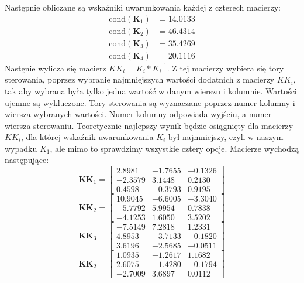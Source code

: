 Następnie obliczane są wskaźniki uwarunkowania każdej z czterech macierzy:
\begin{align}
  \text{cond}(\bm{K}_1) &= \num{14,0133} \\
  \text{cond}(\bm{K}_2) &= \num{46,4314} \\
  \text{cond}(\bm{K}_3) &= \num{35,4269} \\
  \text{cond}(\bm{K}_4) &= \num{20,1116}
\end{align}
Nastęnie wylicza się macierz $KK_i = K_i * K_i^{-1}$. Z tej macierzy
wybiera się tory sterowania, poprzez wybranie najmniejszych wartości dodatnich
z macierzy $KK_i$, tak aby wybrana była tylko jedna wartość w danym wierszu i kolumnie.
Wartości ujemne są wykluczone. Tory sterowania są wyznaczane poprzez numer kolumny
i wiersza wybranych wartości. Numer kolumny odpowiada wyjściu, a numer wiersza sterowaniu.
Teoretycznie najlepszy wynik będzie osiągnięty dla
macierzy $KK_i$, dla której wskaźnik uwarunkowania $K_i$ był najmniejszy, czyli
w naszym wypadku $K_1$, ale mimo to sprawdzimy wszystkie cztery opcje. Macierze
wychodzą następujące:
\begin{equation}
  \bm{KK}_1 =
  \begin{bmatrix}
    \num{2,8981}  & \num{-1,7655} &  \num{-0,1326} \\
      \num{-2,3579}  &  \num{3,1448}   & \num{0,2130} \\
       \num{0,4598} &  \num{-0,3793}   & \num{0,9195}
  \end{bmatrix}
\end{equation}
\begin{equation}
  \bm{KK}_2 =
  \begin{bmatrix}
    \num{10,9045} &  \num{-6,6005}  & \num{-3,3040} \\
      \num{-5,7792} &   \num{5,9954}   & \num{0,7838} \\
      \num{-4,1253}  &  \num{1,6050}   & \num{3,5202}
  \end{bmatrix}
\end{equation}
\begin{equation}
  \bm{KK}_3 =
  \begin{bmatrix}
    \num{-7,5149} &   \num{7,2818} &   \num{1,2331} \\
      \num{4,8953}   & \num{-3,7133}   & \num{-0,1820} \\
      \num{3,6196}  & \num{-2,5685}  & \num{-0,0511}
  \end{bmatrix}
\end{equation}
\begin{equation}
  \bm{KK}_2 =
  \begin{bmatrix}
    \num{1,0935}  & \num{-1,2617} &   \num{1,1682} \\
     \num{2,6075}  & \num{-1,4280} &  \num{-0,1794} \\
    \num{-2,7009} &   \num{3,6897} &   \num{0,0112}
  \end{bmatrix}
\end{equation}
